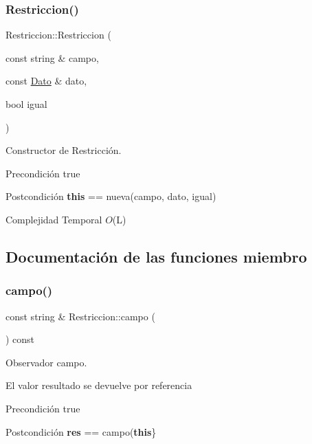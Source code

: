 \subsubsection{\texorpdfstring{Restriccion()}{Restriccion()}}
{\footnotesize\ttfamily Restriccion\+::\+Restriccion (\begin{DoxyParamCaption}\item[{const string \&}]{campo,  }\item[{const \mbox{\hyperlink{classDato}{Dato}} \&}]{dato,  }\item[{bool}]{igual }\end{DoxyParamCaption})}



Constructor de Restricción. 

\begin{DoxyPrecond}{Precondición}
true 
\end{DoxyPrecond}
\begin{DoxyPostcond}{Postcondición}
{\bfseries this} == nueva(campo, dato, igual)
\end{DoxyPostcond}

\begin{DoxyDescription}
\item[Complejidad Temporal]$O$(L)
\end{DoxyDescription}

\subsection{Documentación de las funciones miembro}
\mbox{\label{classRestriccion_a00025b954d3f918c0769e5851aa6e19d}} 
\subsubsection{\texorpdfstring{campo()}{campo()}}
{\footnotesize\ttfamily const string \& Restriccion\+::campo (\begin{DoxyParamCaption}{ }\end{DoxyParamCaption}) const}



Observador campo. 

El valor resultado se devuelve por referencia

\begin{DoxyPrecond}{Precondición}
true 
\end{DoxyPrecond}
\begin{DoxyPostcond}{Postcondición}
{\bfseries res} == campo({\bfseries this}\}
\end{DoxyPostcond}


